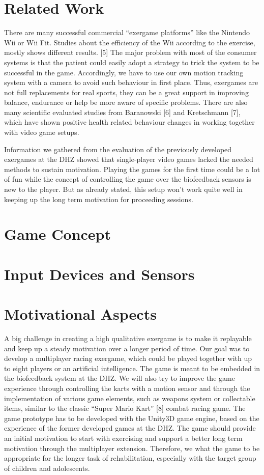 \begin{multicols}{2}
\section{Related Work}
There are many successful commercial “exergame platforms” like the Nintendo Wii or Wii Fit. Studies about the efficiency of the Wii according to the exercise, mostly shows different results. [5] The major problem with most of the consumer systems is that the patient could easily adopt a strategy to trick the system to be successful in the game. Accordingly, we have to use our own motion tracking system with a camera to avoid such behaviour in first place. Thus, exergames are not full replacements for real sports, they can be a great support in improving balance, endurance or help be more aware of specific problems. There are also many scientific evaluated studies from Baranowski [6] and Kretschmann [7], which have shown positive health related behaviour changes in working together with video game setups. \cite[p. 12ff ]{Goe2010}

Information we gathered from the evaluation of the previously developed exergames at the DHZ showed that single-player video games lacked the needed methods to sustain motivation. Playing the games for the first time could be a lot of fun while the concept of controlling the game over the biofeedback sensors is new to the player. But as already stated, this setup won't work quite well in keeping up the long term motivation for proceeding sessions.

\section{Game Concept}


\section{Input Devices and Sensors}


\section{Motivational Aspects}

A big challenge in creating a high qualitative exergame is to make it replayable and keep up a steady motivation over a longer period of time. Our goal was to develop a multiplayer racing exergame, which could be played together with up to eight players or an artificial intelligence. The game is meant to be embedded in the biofeedback system at the DHZ. We will also try to improve the game experience through controlling the karts with a motion sensor and through the implementation of various game elements, such as weapons system or collectable items, similar to the classic “Super Mario Kart” [8] combat racing game. The game prototype has to be developed with the Unity3D game engine, based on the experience of the former developed games at the DHZ. The game should provide an initial motivation to start with exercising and support a better long term motivation through the multiplayer extension. Therefore, we what the game to be appropriate for the longer task of rehabilitation, especially with the target group of children and adolescents. 


\end{multicols}
